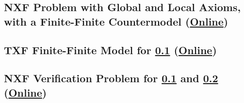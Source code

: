 \documentclass{easychair}
\begin{document}
% 

\newpage
\subsection{NXF Problem with Global and Local Axioms, \\
            with a Finite-Finite Countermodel
(\href{https://raw.githubusercontent.com/GeoffsPapers/InterpretationFormat/master/Examples/NXF_Finite-Finite-Local.p}{Online})}
\label{NXF_Finite-Finite-Local.p}
\begin{small}

\end{small}

\newpage
\subsection{TXF Finite-Finite Model for \ref{NXF_Finite-Finite-Local.p}
(\href{https://raw.githubusercontent.com/GeoffsPapers/InterpretationFormat/master/Examples/NXF_Finite-Finite-Local.s}{Online})}
\label{NXF_Finite-Finite-Local.s}
\begin{small}

\end{small}

\newpage
\subsection{NXF Verification Problem for \ref{NXF_Finite-Finite-Local.p} and
\ref{NXF_Finite-Finite-Local.s}
(\href{https://raw.githubusercontent.com/GeoffsPapers/InterpretationFormat/master/Examples/NXF_Finite-Finite-Local.s.p}{Online})}
\label{NXF_Finite-Finite-Local.s.p}
\begin{small}

\end{small}

% 
\end{document}
